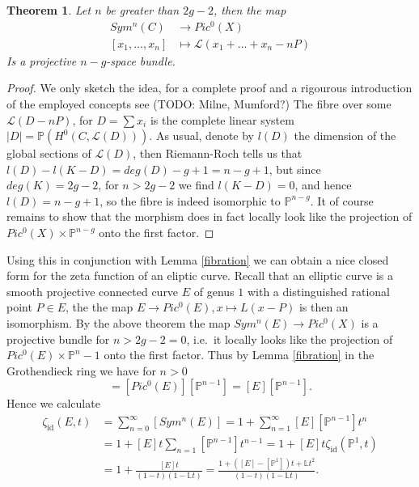 \documentclass[11pt, a4paper, german]{article}
\theoremstyle{plain}
\newtheorem{theorem}{Theorem}[section]
\theoremstyle{definition}
\begin{document}
\begin{theorem}%
    Let $n$ be greater than $2g-2$, then the map  
    \begin{align*}
        Sym^n(C) &\to Pic^0(X) \\
        [x_1,\dots,x_n] &\mapsto \mathcal{L}(x_1 + \dots + x_n - nP)
    \end{align*}
    Is a projective $n-g$-space bundle.%
\end{theorem}
\begin{proof}
    We only sketch the idea, for a complete proof and a rigourous introduction of the employed concepts see (TODO: Milne, Mumford?)
    The fibre over some $\mathcal{L}(D - nP)$, for $D = \sum x_i$ is the complete linear system $|D| = \mathbb{P}(H^0(C, \mathcal{L}(D)))$.
    As usual, denote by $l(D)$ the dimension of the global sections of $\mathcal{L}(D)$, then Riemann-Roch tells us 
    that $l(D) - l(K-D) = deg(D) - g + 1 = n - g + 1$, but since $deg(K) = 2g-2$, for $n > 2g-2$ we find $l(K-D) = 0$, and hence
    $l(D) = n-g+1$, so the fibre is indeed isomorphic to $\mathbb{P}^{n-g}$. It of course remains to show that the morphism does in
    fact locally look like the projection of $Pic^0(X) \times \mathbb{P}^{n-g}$ onto the first factor.
\end{proof}

Using this in conjunction with Lemma \ref{fibration} we can obtain a nice closed form for the zeta function of an eliptic curve.
Recall that an elliptic curve is a smooth projective connected curve $E$ of genus $1$ with a distinguished rational point $P \in E$, the
the map $E \to Pic^0(E), x \mapsto L(x-P)$ is then an isomorphism. By the above theorem the map $Sym^n(E) \to Pic^0(X)$ is a projective bundle for
$n > 2g - 2 = 0$, i.e.\ it locally looks like the projection of $Pic^0(E) \times \mathbb{P}^n-1$ onto the first factor.
Thus by Lemma \ref{fibration} in the Grothendieck ring we have for $n>0$ 
\begin{equation}
    [Sym^n(E)] = [Pic^0(E)][\mathbb{P}^{n-1}] = [E][\mathbb{P}^{n-1}].
\end{equation}
Hence we calculate
\begin{align*}
    \zeta_{\mathrm{id}}(E,t) &= \sum_{n=0}^{\infty} [Sym^n(E)] = 1 + \sum_{n=1}^\infty [E][\mathbb{P}^{n-1}]t^n \\
                             &= 1 + [E]t \sum_{n=1}[\mathbb{P}^{n-1}]t^{n-1} = 1 + [E]t \zeta_{\mathrm{id}}(\mathbb{P}^1, t)\\
                             &= 1 + \frac{[E]t}{(1-t)(1-\mathbb{L}t)} = \frac{1 + ([E]-[\mathbb{P}^1])t + \mathbb{L}t^2}{(1-t)(1-\mathbb{L}t)}.
\end{align*}
\end{document}
